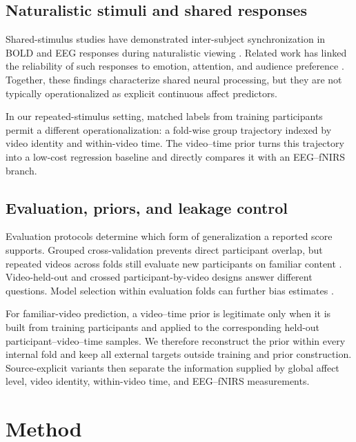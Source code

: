 \subsection{Naturalistic stimuli and shared responses}

Shared-stimulus studies have demonstrated inter-subject synchronization in
BOLD and EEG responses during naturalistic viewing
\cite{hasson2004intersubject,kauppi2010isc,dmochowski2012correlated}.
Related work has linked the reliability of such responses to emotion,
attention, and audience preference
\cite{nummenmaa2012synchrony,ki2016attention,dmochowski2014audience}.
Together, these findings characterize shared neural processing, but they are
not typically operationalized as explicit continuous affect predictors.

In our repeated-stimulus setting, matched labels from training participants
permit a different operationalization: a fold-wise group trajectory indexed
by video identity and within-video time. The video--time prior turns this
trajectory into a low-cost regression baseline and directly compares it with
an EEG--fNIRS branch.

\subsection{Evaluation, priors, and leakage control}

Evaluation protocols determine which form of generalization a reported score
supports. Grouped cross-validation prevents direct participant overlap, but
repeated videos across folds still evaluate new participants on familiar
content \cite{saeb2017usecase,roberts2017crossvalidation}. Video-held-out and
crossed participant-by-video designs answer different questions. Model
selection within evaluation folds can further bias estimates
\cite{varma2006bias,varoquaux2017decoders}.

For familiar-video prediction, a video--time prior is legitimate only when it
is built from training participants and applied to the corresponding held-out
participant--video--time samples. We therefore reconstruct the prior within
every internal fold and keep all external targets outside training and prior
construction. Source-explicit variants then separate the information supplied
by global affect level, video identity, within-video time, and EEG--fNIRS
measurements.

\section{Method}
\label{sec:method}

